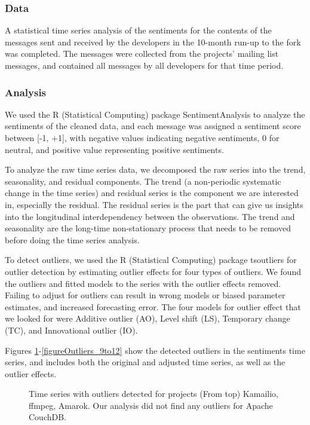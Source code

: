 \documentclass[12pt]{report}
\begin{document}
\subsubsection{Data}
A statistical time series analysis of the sentiments for the contents of the messages sent and received by the developers in the 10-month run-up to the fork was completed. The messages were collected from the projects' mailing list messages, and contained all messages by all developers for that time period.

\subsubsection{Analysis}
We used the R (Statistical Computing) \cite{R} package SentimentAnalysis \cite{Feuer}\cite{Proel} to analyze the sentiments of the cleaned data, and each message was assigned a sentiment score between [-1, +1], with negative values indicating negative sentiments, 0 for neutral, and positive value representing positive sentiments. 

To analyze the raw time series data, we decomposed the raw series into the trend, seasonality, and residual components. The trend (a non-periodic systematic change in the time series) and residual series is the component we are interested in, especially the residual. The residual series is the part that can give us insights into the longitudinal interdependency between the observations. The trend and seasonality are the long-time non-stationary process that needs to be removed before doing the time series analysis.

To detect outliers, we used the R (Statistical Computing) \cite{R} package tsoutliers \cite{Lopez} for outlier detection by estimating outlier effects for four types of outliers. We found the outliers and fitted models to the series with the outlier effects removed. Failing to adjust for outliers can result in wrong models or biased parameter estimates, and increased forecasting error. The four models for outlier effect that we looked for were Additive outlier (AO), Level shift (LS), Temporary change (TC), and Innovational outlier (IO).

Figures \ref{figureOutliers_1to4}-\ref{figureOutliers_9to12} show the detected outliers in the sentiments time series, and includes both the original and adjusted time series, as well as the outlier effects.

\begin{figure}[!htbp]
\centering
{}
\caption{Time series with outliers detected for projects (From top) Kamailio, ffmpeg, Amarok. Our analysis did not find any outliers for Apache CouchDB.}
\label{figureOutliers_1to4}
\end{figure}
\end{document}
